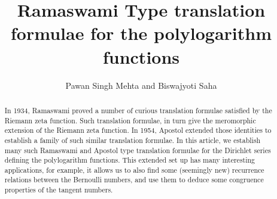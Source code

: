 \documentclass[12pt]{amsart}
\begin{document}

\title[Ramaswami Type translation formulae for the polylogarithm functions]
{Ramaswami Type translation formulae for the polylogarithm functions}

\author{Pawan Singh Mehta  and Biswajyoti Saha}

\address{Pawan Singh Mehta and Biswajyoti Saha\\ \newline
Department of Mathematics, Indian Institute of Technology Delhi, 
Hauz Khas, New Delhi 110016, India.}



\begin{abstract}
In 1934, Ramaswami proved a number of curious translation formulae satisfied by the
Riemann zeta function. Such translation formulae, in turn give the meromorphic extension
of the Riemann zeta function. In 1954, Apostol extended those identities to establish a
family of such similar translation formulae. In this article, we establish many such
Ramaswami and Apostol type translation formulae for the Dirichlet series defining the
polylogarithm functions. This extended set up has many interesting applications, for example,
it allows us to also find some (seemingly new)
recurrence relations between the Bernoulli numbers, and use them to deduce some
congruence properties of the tangent numbers.
\end{abstract}



\maketitle
\end{document}
